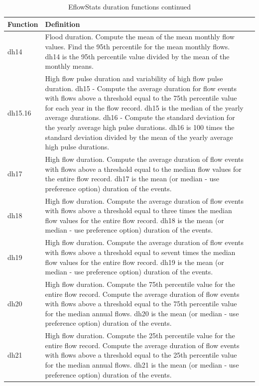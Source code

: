 \documentclass[a4paper,11pt]{article}\usepackage[]{graphicx}\usepackage[]{color}
\begin{document}
\begin{table}[ht]
  \centering
  \begin{threeparttable}[b]
  \caption{EflowStats duration functions continued}
  \label{tab:dur3Stats}
  \begin{tabularx}{\textwidth}{lXl}
  \hline
\textbf{Function} & \textbf{Definition} \\ 
  \hline
  dh14 & Flood duration. Compute the mean of the mean monthly flow values. Find the 95th percentile for the mean monthly flows. dh14 is the 95th percentile value divided by the mean of the monthly means. \\
  dh15.16 & High flow pulse duration and variability of high flow pulse duration. dh15 - Compute the average duration for flow events with flows above a threshold equal to the 75th percentile value for each year in the flow record. dh15 is the median of the yearly average durations. dh16 - Compute the standard deviation for the yearly average high pulse durations. dh16 is 100 times the standard deviation divided by the mean of the yearly average high pulse durations. \\
  dh17 & High flow duration. Compute the average duration of flow events with flows above a threshold equal to the median flow values for the entire flow record. dh17 is the mean (or median - use preference option) duration of the events. \\
  dh18 & High flow duration. Compute the average duration of flow events with flows above a threshold equal to three times the median flow values for the entire flow record. dh18 is the mean (or median - use preference option) duration of the events. \\
  dh19 & High flow duration. Compute the average duration of flow events with flows above a threshold equal to sevent times the median flow values for the entire flow record. dh19 is the mean (or median - use preference option) duration of the events. \\
  dh20 & High flow duration. Compute the 75th percentile value for the entire flow record. Compute the average duration of flow events with flows above a threshold equal to the 75th percentile value for the median annual flows. dh20 is the mean (or median - use preference option) duration of the events. \\
  dh21 & High flow duration. Compute the 25th percentile value for the entire flow record. Compute the average duration of flow events with flows above a threshold equal to the 25th percentile value for the median annual flows. dh21 is the mean (or median - use preference option) duration of the events. \\

\end{tabularx}
\end{threeparttable}
\end{table}
\end{document}
